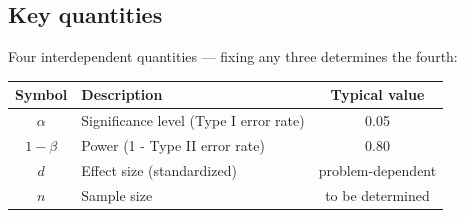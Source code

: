 \subsection{Key quantities}
Four interdependent quantities — fixing any three determines the fourth:
\begin{center}
\begin{tabular}{|c|l|c|}
    \hline
    \textbf{Symbol} & \textbf{Description} & \textbf{Typical value} \\
    \hline
    $\alpha$ & Significance level (Type I error rate) & 0.05 \\
    $1-\beta$ & Power (1 - Type II error rate) & 0.80 \\
    $d$ & Effect size (standardized) & problem-dependent \\
    $n$ & Sample size & to be determined \\
    \hline
\end{tabular}
\end{center}

